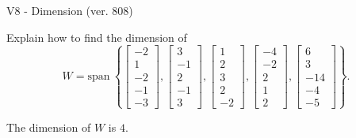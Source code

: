 \begin{exercise}
  \begin{exerciseTitle}V8 - Dimension (ver. 808)\end{exerciseTitle}
  \begin{exerciseStatement}
    Explain how to find the dimension of 
\[W=\mathrm{span}\ \left\{\left[\begin{array}{r}
-2 \\
1 \\
-2 \\
-1 \\
-3
\end{array}\right] , \left[\begin{array}{r}
3 \\
-1 \\
2 \\
-1 \\
3
\end{array}\right] , \left[\begin{array}{r}
1 \\
2 \\
3 \\
2 \\
-2
\end{array}\right] , \left[\begin{array}{r}
-4 \\
-2 \\
2 \\
1 \\
2
\end{array}\right] , \left[\begin{array}{r}
6 \\
3 \\
-14 \\
-4 \\
-5
\end{array}\right]\right\}.\]



  \end{exerciseStatement}
  \begin{exerciseAnswer}
   The dimension of \(W\) is  \(4\).
  


  \end{exerciseAnswer}
\end{exercise}